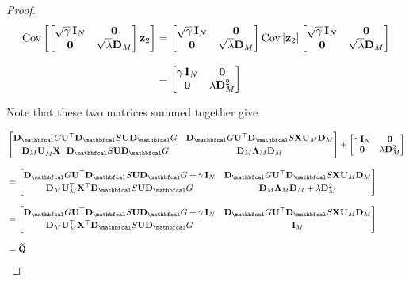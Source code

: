 \begin{proof}
\begin{align*}
    \text{Cov}\left[\begin{bmatrix}
        \sqrt{\gamma} \, \mathbf{I}_N & \mathbf{0} \\
        \mathbf{0} & \sqrt{\lambda} \mathbf{D}_M
    \end{bmatrix} \mathbf{z}_2  \right] &= \begin{bmatrix}
        \sqrt{\gamma} \, \mathbf{I}_N & \mathbf{0} \\
        \mathbf{0} & \sqrt{\lambda} \mathbf{D}_M
    \end{bmatrix}  \text{Cov}\left[ \mathbf{z}_2 \right] \begin{bmatrix}
        \sqrt{\gamma} \, \mathbf{I}_N & \mathbf{0} \\
        \mathbf{0} & \sqrt{\lambda} \mathbf{D}_M
    \end{bmatrix} \\[0.3cm]
    &= \begin{bmatrix}
        \gamma\, \mathbf{I}_N & \mathbf{0} \\
        \mathbf{0} & \lambda \mathbf{D}_M^2
    \end{bmatrix}
\end{align*}

Note that these two matrices summed together give 

\begin{align*}
    & \begin{bmatrix}
        \D_\Gt \U^\top \D_\St \U \D_\Gt  &  \D_\Gt \U^\top \D_\St \X \U_M \D_M \\[0.1cm] 
        \D_M \U_M^\top \X^\top \D_\St \U \D_\Gt & \D_M \LAM_M \D_M 
        \end{bmatrix} + \begin{bmatrix}
            \gamma\, \I_N & \zero \\
            \zero & \lambda \D_M^2
        \end{bmatrix} \\[0.3cm]
        &= \begin{bmatrix}
            \D_\Gt \U^\top \D_\St \U \D_\Gt  + \gamma\, \I_N &  \D_\Gt \U^\top \D_\St \X \U_M \D_M \\[0.1cm] 
            \D_M \U_M^\top \X^\top \D_\St \U \D_\Gt & \D_M \LAM_M \D_M + \lambda \D_M^2
            \end{bmatrix} \\[0.3cm]
        &= \begin{bmatrix}
            \D_\Gt \U^\top \D_\St \U \D_\Gt  + \gamma\, \I_N &  \D_\Gt \U^\top \D_\St \X \U_M \D_M \\[0.1cm] 
            \D_M \U_M^\top \X^\top \D_\St \U \D_\Gt & \I_M
            \end{bmatrix} \\[0.3cm]
        &= \widetilde{\Q}
\end{align*}


\end{proof}
